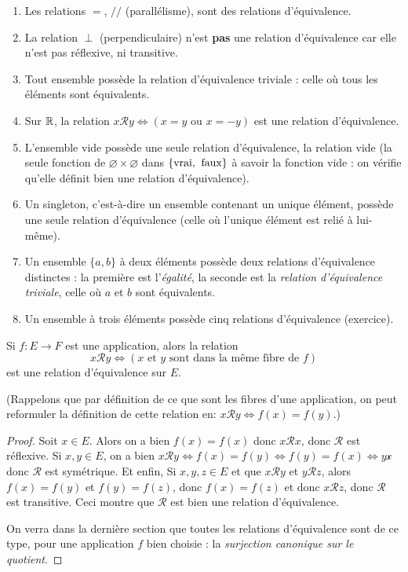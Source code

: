 \begin{exemples}
\begin{enumerate}[label=\alph*)]
\item Les relations $=$, $//$ (parallélisme), sont des relations d'équivalence.
\item La relation $\perp$ (perpendiculaire) n'est \textbf{pas} une relation d'équivalence car elle n'est pas réflexive, ni transitive.
\item Tout ensemble possède la relation d'équivalence triviale : celle où tous les éléments sont équivalents.
\item Sur $\mathbb{R}$, la relation $x\mathcal R y \iff \left(x=y\text{ ou }x=-y\right)$ est une relation d'équivalence.
\item L'ensemble vide possède une seule relation d'équivalence, la relation vide (la seule fonction de $\varnothing \times \varnothing$ dans $\{\text{vrai,\: faux}\}$ à savoir la fonction vide : on vérifie qu'elle définit bien une relation d'équivalence).
\item Un singleton, c'est-à-dire un ensemble contenant un unique élément, possède une seule relation d'équivalence (celle où l'unique élément est relié à lui-même).
\item Un ensemble $\{a,b\}$ à deux éléments possède deux relations d'équivalence distinctes : la première est l'\emph{égalité}, la seconde est la \emph{relation d'équivalence triviale}, celle où $a$ et $b$ sont équivalents.
\item Un ensemble à trois éléments possède cinq relations d'équivalence (exercice).
\end{enumerate}
\end{exemples}

\begin{proposition}
Si $f : E\to F$ est une application, alors la relation 
\[
x\mathcal R y \iff (x\text{ et }y \text{ sont dans la même fibre de }f)
\]
est une relation d'équivalence sur $E$.

(Rappelons que par définition de ce que sont les fibres d'une application, on peut reformuler la définition de cette relation en: $x\mathcal R y \iff f(x)=f(y)$.)
\end{proposition}
\begin{proof}
Soit $x \in E$. Alors on a bien $f(x)=f(x)$ donc $x\mathcal R x$, donc $\mathcal R$ est réflexive. Si $x, y\in E$, on a bien $x\mathcal R y \iff f(x)=f(y) \iff f(y)=f(x) \iff y\mathcal x$ donc $\mathcal R$ est symétrique. Et enfin, Si $x,y,z\in E$ et que $x\mathcal R y$ et $y\mathcal R z$, alors $f(x)=f(y)$ et $f(y)=f(z)$, donc $f(x)=f(z)$ et donc $x\mathcal R z$, donc $\mathcal R$ est transitive. Ceci montre que $\mathcal R$ est bien une relation d'équivalence.

On verra dans la dernière section que toutes les relations d'équivalence sont de ce type, pour une application $f$ bien choisie : la \emph{surjection canonique sur le quotient}.
\end{proof}

